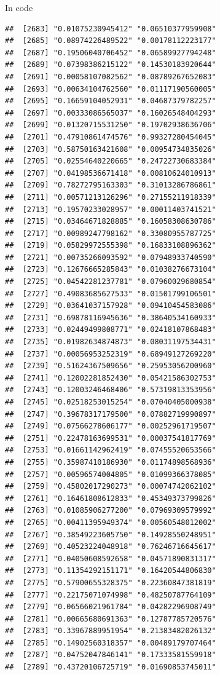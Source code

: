 \documentclass[ignorenonframetext,]{beamer}
\begin{document}
\begin{frame}[fragile]{In code}
\begin{verbatim}
##  [2683] "0.01075230945412" "0.06510377959908"
##  [2685] "0.08974226489522" "0.00178112223177"
##  [2687] "0.19506040706452" "0.06589927794248"
##  [2689] "0.07398386215122" "0.14530183920644"
##  [2691] "0.00058107082562" "0.08789267652083"
##  [2693] "0.00634104762560" "0.01117190560005"
##  [2695] "0.16659104052931" "0.04687379782257"
##  [2697] "0.00333086565037" "0.16026548404293"
##  [2699] "0.01320715531250" "0.19702938636706"
##  [2701] "0.47910861474576" "0.99327280454045"
##  [2703] "0.58750163421608" "0.00954734835026"
##  [2705] "0.02554640220665" "0.24722730683384"
##  [2707] "0.04198536671418" "0.00810624010913"
##  [2709] "0.78272795163303" "0.31013286786861"
##  [2711] "0.00571213126296" "0.27155211918339"
##  [2713] "0.19570233028957" "0.00011403741521"
##  [2715] "0.03464671828885" "0.16058308630786"
##  [2717] "0.00989247798162" "0.33080955787725"
##  [2719] "0.05829972555398" "0.16833108896362"
##  [2721] "0.00735266093592" "0.07948933740590"
##  [2723] "0.12676665285843" "0.01038276673104"
##  [2725] "0.04542281237781" "0.07960029680854"
##  [2727] "0.49083685627533" "0.01501799106501"
##  [2729] "0.03641037157928" "0.09410454583086"
##  [2731] "0.69878116945636" "0.38640534160933"
##  [2733] "0.02449499808771" "0.02418107868483"
##  [2735] "0.01982634874873" "0.08031197534431"
##  [2737] "0.00056953252319" "0.68949127269220"
##  [2739] "0.51624367509656" "0.25953056200960"
##  [2741] "0.12002281852430" "0.05421586302753"
##  [2743] "0.12003246468406" "0.57319813353956"
##  [2745] "0.02518253015254" "0.07040405000938"
##  [2747] "0.39678317179500" "0.07882719990897"
##  [2749] "0.07566278606177" "0.00252961719507"
##  [2751] "0.22478163699531" "0.00037541817769"
##  [2753] "0.01661142962419" "0.07455520653566"
##  [2755] "0.35987410186930" "0.01174898568936"
##  [2757] "0.00596574004805" "0.01099366378085"
##  [2759] "0.45802017290273" "0.00074742062102"
##  [2761] "0.16461808612833" "0.45349373799826"
##  [2763] "0.01085906277200" "0.07969309579992"
##  [2765] "0.00411395949374" "0.00560548012002"
##  [2767] "0.38549223605750" "0.14928550248951"
##  [2769] "0.40523224048918" "0.76246716645617"
##  [2771] "0.04050608592658" "0.04571890831317"
##  [2773] "0.11354292151171" "0.16420544806830"
##  [2775] "0.57900655328375" "0.22360847381819"
##  [2777] "0.22175071074998" "0.48250787764109"
##  [2779] "0.06566021961784" "0.04282296908749"
##  [2781] "0.00665680691363" "0.12787785720576"
##  [2783] "0.33967889951954" "0.21383482026132"
##  [2785] "0.14902560318357" "0.00489179707464"
##  [2787] "0.04752047846141" "0.17333581559918"
##  [2789] "0.43720106725719" "0.01690853745011"

\end{verbatim}
\end{frame}
\end{document}
